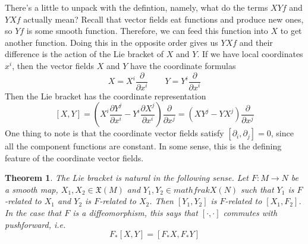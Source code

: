 \documentclass[psamsfonts]{amsart}
\newtheorem{thm}{Theorem}[section]
\theoremstyle{definition}
\theoremstyle{remark}
\begin{document}
%
There's a little to unpack with the defintion, namely, what do the terms
$XYf$ and $YXf$ actually mean? Recall that vector fields eat functions and
produce new ones, so $Yf$ is some smooth function. Therefore, we can feed this
function into $X$ to get another function. Doing this in the opposite order
gives us $YXf$ and their difference is the action of the Lie bracket of $X$
and $Y$. If we have local coordinates $x^i$, then the vector fields $X$
and $Y$ have the coordinate formulas
\[
X = X^i \frac{\partial}{\partial x^i} \qquad Y = Y^i \frac{\partial }{\partial x^i}
\]
Then the Lie bracket has the coordinate representation
\[
[X,Y] = \left( X^i\frac{\partial Y^j}{\partial x^i} - Y^i\frac{\partial X^j}{\partial x^i}
\right) \frac{\partial}{\partial x^j} = \left( XY^j - YX^j \right)
\frac{\partial}{\partial x^j}
\]
One thing to note is that the coordinate vector fields satisfy
$[\partial_i,\partial_j] = 0$, since all the component functions are constant.
In some sense, this is the defining feature of the coordinate vector fields.
%
\begin{thm}
The Lie bracket is natural in the following sense. Let $F : M \to N$
be a smooth map, $X_1, X_2 \in \mathfrak{X}(M)$ and $Y_1,Y_2 \in mathfrak{X}(N)$
such that $Y_1$ is $F$-related to $X_1$ and $Y_2$ is $F$-related to $X_2$. Then
$[Y_1,Y_2]$ is $F$-related to $[X_1,F_2]$. In the case that $F$ is a diffeomorphism,
this says that $[\cdot,\cdot]$ commutes with pushforward, i.e.
\[
F_*[X,Y] = [F_*X,F_*Y]
\]
\end{thm}
%
\end{document}
